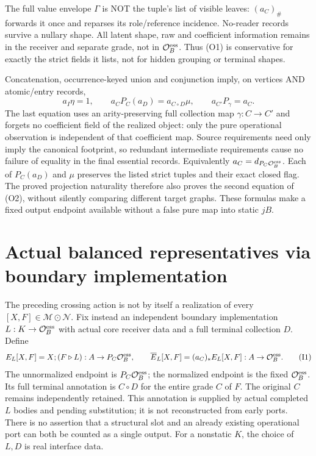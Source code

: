\documentclass[11pt]{article}
\begin{document}
The full value envelope $\Gamma$ is NOT the tuple's list of visible leaves: $(a_C)_\#$ forwards it once and reparses its role/reference incidence. No-reader records survive a nullary shape. All latent shape, raw and coefficient information remains in the receiver and separate grade, not in $\mathcal O_B^{\rm ess}$. Thus (O1) is conservative for exactly the strict fields it lists, not for hidden grouping or terminal shapes.

Concatenation, occurrence-keyed union and conjunction imply, on vertices AND atomic/entry records,
\[
 a_I\eta=1,\qquad
 a_C P_C(a_D)=a_{C\circ D}\mu,\qquad
 a_{C'}P_\gamma=a_C.                                    \tag{O2}
\]
The last equation uses an arity-preserving full collection map $\gamma:C\to C'$ and forgets no coefficient field of the realized object: only the pure operational observation is independent of that coefficient map. Source requirements need only imply the canonical footprint, so redundant intermediate requirements cause no failure of equality in the final essential records. Equivalently $a_C=d_{P_C\mathcal O_B^{\rm ess}}$. Each of $P_C(a_D)$ and $\mu$ preserves the listed strict tuples and their exact closed flag. The proved projection naturality therefore also proves the second equation of (O2), without silently comparing different target graphs. These formulas make a fixed output endpoint available without a false pure map into static $jB$.

\section{Actual balanced representatives via boundary implementation}
The preceding crossing action is not by itself a realization of every $[X,F]\in\mathcal M\odot\mathcal N$. Fix instead an independent boundary implementation $L:K\to\mathcal O_B^{\rm ess}$ with actual core receiver data and a full terminal collection $D$. Define
\[
             E_L[X,F]=X;(F\triangleright L):A\to P_C\mathcal O_B^{\rm ess},
 \qquad\overline E_L[X,F]=(a_C)_*E_L[X,F]:A\to\mathcal O_B^{\rm ess}. \tag{I1}
\]
The unnormalized endpoint is $P_C\mathcal O_B^{\rm ess}$; the normalized endpoint is the fixed $\mathcal O_B^{\rm ess}$. Its full terminal annotation is $C\circ D$ for the entire grade $C$ of $F$. The original $C$ remains independently retained. This annotation is supplied by actual completed $L$ bodies and pending substitution; it is not reconstructed from early ports. There is no assertion that a structural slot and an already existing operational port can both be counted as a single output. For a nonstatic $K$, the choice of $L,D$ is real interface data.
\end{document}
